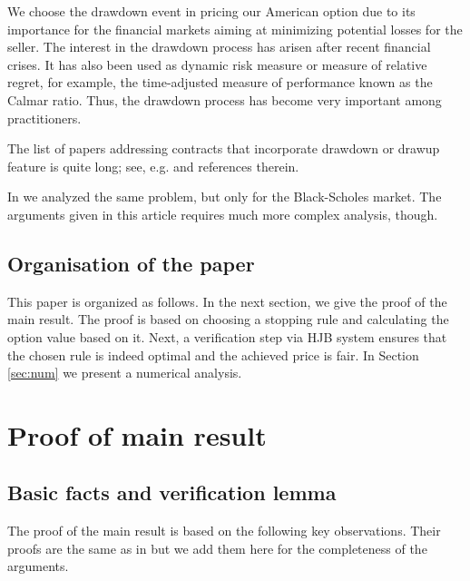 \documentclass[10pt]{amsart}
\begin{document}
	
	We choose the drawdown event in pricing our American option due to its importance for the financial markets aiming
	at minimizing potential losses for the seller.
	The interest in the drawdown process has arisen after recent financial crises. It has also been used as dynamic
risk measure or measure of relative regret, for example, the time-adjusted measure of performance known as the Calmar
ratio. Thus, the drawdown process has become very
	important among practitioners.
	
	The list of papers addressing contracts that incorporate drawdown or drawup feature is quite long; see,
	e.g. \cite{CZH, GZ, MA, ZP&JT2, ZP&JT, drawdownup2, PV, Sorn, Vec1,Vec2, drawdownup1, olympia}
	and references therein.
	
	In \cite{naszapraca} we analyzed the same problem, but only for the Black-Scholes market. The arguments given in this article requires much more complex analysis, though.
	
	
	\subsection{Organisation of the paper}
	This paper is organized as follows. In the next section, we give the proof of the main result. The proof is based on choosing a stopping rule and calculating the option value based on it. Next, a verification step via HJB system ensures that the chosen rule is indeed optimal and the achieved price is fair.
	In Section \ref{sec:num} we present a numerical analysis.
	
	
	
	\section{Proof of main result}
	\subsection{Basic facts and verification lemma}
	The proof of the main result is based on the following
	key observations.
	Their proofs are the same as in \cite{naszapraca} but we add them here for the completeness of the arguments.
	
\end{document}

